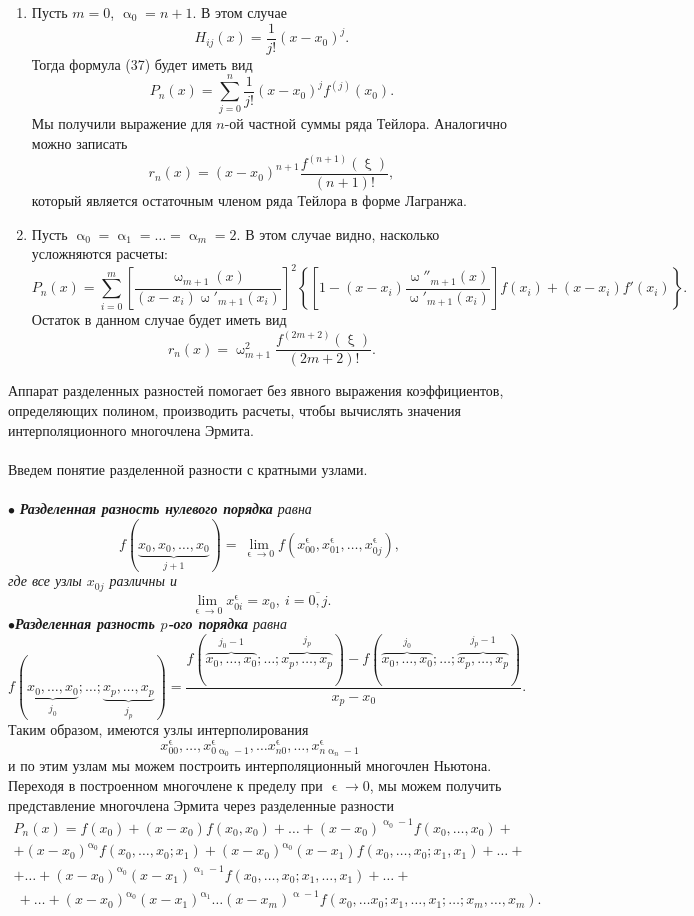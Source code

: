 \documentclass[a4paper, 12pt]{report}
\numberwithin{equation}{section}
\renewcommand{\alpha}{\upalpha}
\renewcommand{\omega}{\upomega}
\renewcommand{\xi}{\upxi}
\renewcommand{\varepsilon}{\upvarepsilon}
\begin{document}
	 \begin{enumerate}
	 	\item Пусть $m = 0$, $\alpha_0 = n+1$. В этом случае $$H_{ij}(x) =\dfrac{1}{j!}(x-x_0)^j.$$
	 	Тогда формула (37) будет иметь вид $$P_n(x) = \sum_{j=0}^n \dfrac{1}{j!}(x-x_0)^j f^{(j)}(x_0).$$
	 	Мы получили выражение для $n$-ой частной суммы ряда Тейлора. Аналогично можно записать $$r_n(x) =(x-x_0)^{n+1} \dfrac{f^{(n+1)}(\xi)}{(n+1)!},$$ который является остаточным членом ряда Тейлора в форме Лагранжа.
	 	\item Пусть $\alpha_0 = \alpha_1 = \ldots = \alpha_m = 2$. В этом случае видно, насколько усложняются расчеты: $$P_n(x) = \sum_{i=0}^m\left[\dfrac{\omega_{m+1}(x)}{(x-x_i)\omega'_{m+1}(x_i)}\right]^2 \left\{ \left[1 - (x-x_i)\dfrac{\omega''_{m+1}(x)}{\omega'_{m+1}(x_i)}\right]f(x_i) + (x-x_i)f'(x_i)\right\}.$$
	 	Остаток в данном случае будет иметь вид $$r_n(x) = \omega_{m+1}^2 \dfrac{f^{(2m+2)}(\xi)}{(2m+2)!}.$$
	 \end{enumerate}
	 Аппарат разделенных разностей помогает без явного выражения коэффициентов, определяющих полином, производить расчеты, чтобы вычислять значения интерполяционного многочлена Эрмита.\\\\
	 Введем понятие разделенной разности с кратными узлами. \\\\
	 $\bullet$ \textit{\textbf{Разделенная разность нулевого порядка} равна $$f(\underbrace{x_0,x_0,\ldots,x_0}_{j+1}) = \lim\limits_{\varepsilon\to 0} f(x_{00}^\varepsilon, x_{01}^\varepsilon,\ldots, x_{0j}^\varepsilon),$$ где все узлы $x_{0j}$ различны и $$\lim\limits_{\varepsilon\to 0} x_{0i}^\varepsilon = x_0,\ i = \overline{0,j}.$$
	 $\bullet$\textbf{Разделенная разность $p$-ого порядка} равна $$f(\underbrace{x_0,\ldots, x_0}_{j_0}; \ldots; \underbrace{x_p,\ldots, x_p}_{j_p}) = \dfrac{f(\overbrace{x_0,\ldots, x_0}^{j_0-1}; \ldots; \overbrace{x_p,\ldots, x_p}^{j_p}) - f(\overbrace{x_0,\ldots, x_0}^{j_0}; \ldots; \overbrace{x_p,\ldots, x_p}^{j_p-1})}{x_p - x_0}.$$}
	 Таким образом, имеются узлы интерполирования $$x_{00}^\varepsilon,\ldots, x_{0\alpha_0 - 1}^\varepsilon, \ldots x_{n0}^\varepsilon,\ldots, x_{n\alpha_n - 1}^\varepsilon$$ и по этим узлам мы можем построить интерполяционный многочлен Ньютона. Переходя в построенном многочлене к пределу при $\varepsilon \to 0$, мы можем получить представление многочлена Эрмита через разделенные разности
	 \begin{multline}
	 	P_n(x) = f(x_0) + (x-x_0)f(x_0, x_0) + \ldots + (x-x_0)^{\alpha_0-1}f(x_0,\ldots, x_0) + \\ + (x-x_0)^{\alpha_0}f(x_0,\ldots, x_0; x_1)+ (x-x_0)^{\alpha_0}(x-x_1)f(x_0,\ldots, x_0; x_1, x_1) +\ldots +\\+ \ldots + (x-x_0)^{\alpha_0}(x-x_1)^{\alpha_1-1} f(x_0,\ldots, x_0; x_1,\ldots, x_1) + \ldots+ \\\ +\ldots + (x-x_0)^{\alpha_0}(x-x_1)^{\alpha_1}\ldots(x-x_m)^{\alpha-1}f(x_0,\ldots x_0; x_1,\ldots, x_1; \ldots; x_{m},\ldots, x_{m}).
	 \end{multline}
\end{document}
